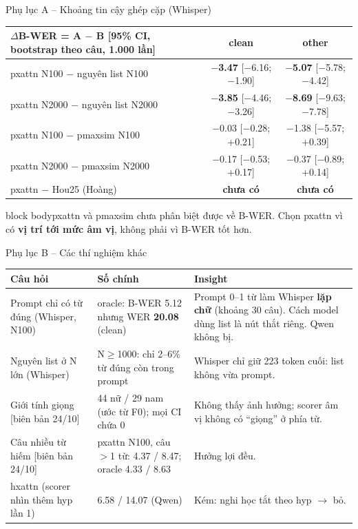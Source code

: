 \documentclass[aspectratio=169,xcolor=table]{beamer}
\newcommand{\bad}[1]{\textcolor{RiskRed}{\textbf{#1}}}
\newcommand{\good}[1]{\textcolor{GoodGreen}{\textbf{#1}}}
\newcommand{\src}[1]{{\tiny\color{TextGray}[#1]}}
\newcommand{\ra}{$\rightarrow$}
\newcommand{\nbox}[2][block body]{\begin{beamercolorbox}[sep=0.45em,rounded=true]{#1}\footnotesize #2\end{beamercolorbox}}
\begin{document}
\begin{frame}{Phụ lục A -- Khoảng tin cậy ghép cặp (Whisper)}
\centering\small\setlength{\tabcolsep}{6pt}
\begin{tabular}{lcc}
\toprule
$\Delta$B-WER = A $-$ B \src{95\% CI, bootstrap theo câu, 1.000 lần} & clean & other\\
\midrule
pxattn N100 $-$ nguyên list N100 & \good{$-$3.47} [$-$6.16; $-$1.90] & \good{$-$5.07} [$-$5.78; $-$4.42]\\
pxattn N2000 $-$ nguyên list N2000 & \good{$-$3.85} [$-$4.46; $-$3.26] & \good{$-$8.69} [$-$9.63; $-$7.78]\\
\midrule
pxattn N100 $-$ pmaxsim N100 & $-$0.03 [$-$0.28; +0.21] & $-$1.38 [$-$5.57; +0.39]\\
pxattn N2000 $-$ pmaxsim N2000 & $-$0.17 [$-$0.53; +0.17] & $-$0.37 [$-$0.89; +0.14]\\
\midrule
pxattn $-$ Hou25 (Hoàng) & \bad{chưa có} & \bad{chưa có}\\
\bottomrule
\end{tabular}\par
\vspace{0.3cm}\raggedright
\nbox{pxattn và pmaxsim chưa phân biệt được về B-WER. Chọn pxattn vì có \textbf{vị trí tới mức âm vị}, không phải vì B-WER tốt hơn.}
\end{frame}

\begin{frame}{Phụ lục B -- Các thí nghiệm khác}
\centering\scriptsize\setlength{\tabcolsep}{3pt}
\begin{tabular}{L{3.3cm}L{5.6cm}L{5.3cm}}
\toprule
Câu hỏi & Số chính & Insight\\
\midrule
Prompt chỉ có từ đúng (Whisper, N100) & oracle: B-WER 5.12 nhưng WER \bad{20.08} (clean) & Prompt 0--1 từ làm Whisper \textbf{lặp chữ} (khoảng 30 câu). Cách model dùng list là nút thắt riêng. Qwen không bị.\\
\addlinespace
Nguyên list ở N lớn (Whisper) & N$\geq$1000: chỉ 2--6\% từ đúng còn trong prompt & Whisper chỉ giữ 223 token cuối: list không vừa prompt.\\
\addlinespace
Giới tính giọng \src{biên bản 24/10} & 44 nữ / 29 nam (ước từ F0); mọi CI chứa 0 & Không thấy ảnh hưởng; scorer âm vị không có ``giọng'' ở phía từ.\\
\addlinespace
Câu nhiều từ hiếm \src{biên bản 24/10} & pxattn N100, câu $>$1 từ: 4.37 / 8.47; oracle 4.33 / 8.63 & Hưởng lợi đều.\\
\addlinespace
hxattn (scorer nhìn thêm hyp lần 1) & 6.58 / 14.07 (Qwen) & Kém: nghi học tắt theo hyp \ra{} bỏ.\\
\bottomrule
\end{tabular}
\end{frame}
\end{document}
